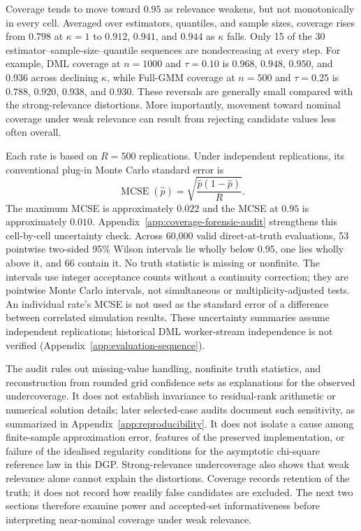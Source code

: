 Coverage tends to move toward $0.95$ as relevance weakens, but not monotonically in every cell. Averaged over estimators, quantiles, and sample sizes, coverage rises from $0.798$ at $\kappa=1$ to $0.912$, $0.941$, and $0.944$ as $\kappa$ falls. Only 15 of the 30 estimator--sample-size--quantile sequences are nondecreasing at every step. For example, DML coverage at $n=1000$ and $\tau=0.10$ is $0.968$, $0.948$, $0.950$, and $0.936$ across declining $\kappa$, while Full-GMM coverage at $n=500$ and $\tau=0.25$ is $0.788$, $0.920$, $0.938$, and $0.930$. These reversals are generally small compared with the strong-relevance distortions. More importantly, movement toward nominal coverage under weak relevance can result from rejecting candidate values less often overall.

Each rate is based on $R=500$ replications. Under independent replications, its conventional plug-in Monte Carlo standard error is
\[
\operatorname{MCSE}(\widehat p)
=
\sqrt{\frac{\widehat p(1-\widehat p)}{R}}.
\]
The maximum MCSE is approximately $0.022$ and the MCSE at $0.95$ is approximately $0.010$. Appendix~\ref{app:coverage-forensic-audit} strengthens this cell-by-cell uncertainty check. Across 60,000 valid direct-at-truth evaluations, 53 pointwise two-sided 95\% Wilson intervals lie wholly below $0.95$, one lies wholly above it, and 66 contain it. No truth statistic is missing or nonfinite. The intervals use integer acceptance counts without a continuity correction; they are pointwise Monte Carlo intervals, not simultaneous or multiplicity-adjusted tests. An individual rate's MCSE is not used as the standard error of a difference between correlated simulation results. These uncertainty summaries assume independent replications; historical DML worker-stream independence is not verified (Appendix~\ref{app:evaluation-sequence}).

The audit rules out missing-value handling, nonfinite truth statistics, and reconstruction from rounded grid confidence sets as explanations for the observed undercoverage. It does not establish invariance to residual-rank arithmetic or numerical solution details; later selected-case audits document such sensitivity, as summarized in Appendix~\ref{app:reproducibility}. It does not isolate a cause among finite-sample approximation error, features of the preserved implementation, or failure of the idealised regularity conditions for the asymptotic chi-square reference law in this DGP. Strong-relevance undercoverage also shows that weak relevance alone cannot explain the distortions. Coverage records retention of the truth; it does not record how readily false candidates are excluded. The next two sections therefore examine power and accepted-set informativeness before interpreting near-nominal coverage under weak relevance.


